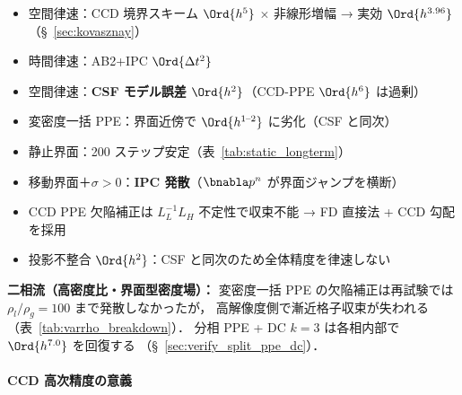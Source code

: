 \begin{description}[style=nextline,leftmargin=2em]
  \item[\textbf{単相 NS ソルバ}（設計精度をほぼ完全に発現）]
    \begin{itemize}[noitemsep]
      \item 空間律速：CCD 境界スキーム $\Ord{h^5}$ $\times$ 非線形増幅 → 実効 $\Ord{h^{3.96}}$（§~\ref{sec:kovasznay}）
      \item 時間律速：AB2+IPC $\Ord{\Delta t^2}$
    \end{itemize}

  \item[\textbf{二相流（$\rho_l/\rho_g \leq 5$，smoothed Heaviside）}]
    \begin{itemize}[noitemsep]
      \item 空間律速：\textbf{CSF モデル誤差 $\Ord{h^2}$}（CCD-PPE $\Ord{h^6}$ は過剰）
      \item 変密度一括 PPE：界面近傍で $\Ord{h^{1\text{--}2}}$ に劣化（CSF と同次）
      \item 静止界面：200 ステップ安定（表~\ref{tab:static_longterm}）
      \item 移動界面＋$\sigma > 0$：\textbf{IPC 発散}（$\bnabla p^n$ が界面ジャンプを横断）
    \end{itemize}

  \item[\textbf{PPE 離散化}]
    \begin{itemize}[noitemsep]
      \item CCD PPE 欠陥補正は $L_L^{-1} L_H$ 不定性で収束不能 → FD 直接法 + CCD 勾配を採用
      \item 投影不整合 $\Ord{h^2}$：CSF と同次のため全体精度を律速しない
    \end{itemize}
\end{description}

\noindent\textbf{二相流（高密度比・界面型密度場）：}
変密度一括 PPE の欠陥補正は再試験では $\rho_l/\rho_g = 100$ まで発散しなかったが，
高解像度側で漸近格子収束が失われる（表~\ref{tab:varrho_breakdown}）．
分相 PPE + DC $k{=}3$ は各相内部で $\Ord{h^{7.0}}$ を回復する
（§~\ref{sec:verify_split_ppe_dc}）．

\paragraph{CCD 高次精度の意義}

